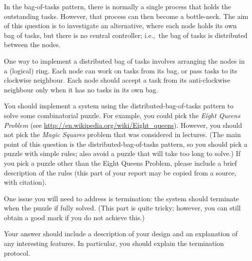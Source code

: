 \begin{question}
In the bag-of-tasks pattern, there is normally a single process that holds the
outstanding tasks.  However, that process can then become a bottle-neck.  The
aim of this question is to investigate an alternative, where each node holds
its own bag of tasks, but there is no central controller; i.e.,\ the bag of
tasks is distributed between the nodes.

One way to implement a distributed bag of tasks involves arranging the nodes
in a (logical) ring.  Each node can work on tasks from its bag, or pass tasks
to its clockwise neighbour.  Each node should accept a task from its
anti-clockwise neighbour only when it has no tasks in its own bag.

You should implement a system using the distributed-bag-of-tasks pattern to
solve some combinatorial puzzle.  For example, you could pick the \emph{Eight
  Queens Problem} (see \url{http://en.wikipedia.org/wiki/Eight_queens}).
However, you should not pick the \emph{Magic Squares} problem that was
considered in lectures.  (The main point of this question is the
distributed-bag-of-tasks pattern, so you should pick a puzzle with simple
rules; also avoid a puzzle that will take too long to solve.)  If you pick a
puzzle other than the Eight Queens Problem, please include a brief description
of the rules (this part of your report may be copied from a source, with
citation).

One issue you will need to address is termination: the system should terminate
when the puzzle if fully solved.  (This part is quite tricky; however, you can
still obtain a good mark if you do not achieve this.)

Your answer should include a description of your design and an explanation of
any interesting features.  In particular, you should explain the termination
protocol.

\end{question}



